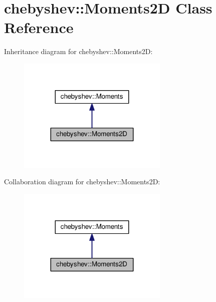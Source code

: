 \hypertarget{classchebyshev_1_1_moments2_d}{}\section{chebyshev\+:\+:Moments2D Class Reference}
\label{classchebyshev_1_1_moments2_d}


Inheritance diagram for chebyshev\+:\+:Moments2D\+:\nopagebreak
\begin{figure}[H]
\begin{center}
\leavevmode
\includegraphics[width=203pt]{classchebyshev_1_1_moments2_d__inherit__graph}
\end{center}
\end{figure}


Collaboration diagram for chebyshev\+:\+:Moments2D\+:\nopagebreak
\begin{figure}[H]
\begin{center}
\leavevmode
\includegraphics[width=203pt]{classchebyshev_1_1_moments2_d__coll__graph}
\end{center}
\end{figure}
